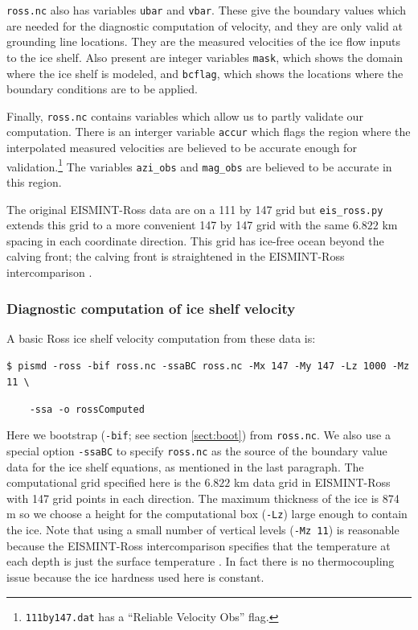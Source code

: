 \documentclass[11pt,final]{amsart}
\begin{document}
\verb|ross.nc| also has variables \verb|ubar| and \verb|vbar|.  These give the boundary values which are needed for the diagnostic computation of velocity, and they are only valid at grounding line locations.  They are the measured velocities of the ice flow inputs to the ice shelf.  Also present are integer variables \verb|mask|, which shows the domain where the ice shelf is modeled, and \verb|bcflag|, which shows the locations where the boundary conditions are to be applied.

Finally, \verb|ross.nc| contains variables which allow us to partly validate our computation.  There is an interger variable \verb|accur| which flags the region where the interpolated measured velocities are believed to be accurate enough for validation.\footnote{\texttt{111by147.dat} has a ``Reliable Velocity Obs'' flag.}  The variables \verb|azi_obs| and \verb|mag_obs| are believed to be accurate in this region.

The original EISMINT-Ross data are on a 111 by 147 grid but \verb|eis_ross.py| extends this grid to a more convenient 147 by 147 grid with the same $6.822$ km spacing in each coordinate direction.  This grid has ice-free ocean beyond the calving front; the calving front is straightened in the EISMINT-Ross intercomparison \cite{MacAyealetal}.

\subsubsection*{Diagnostic computation of ice shelf velocity}  A basic Ross ice shelf velocity computation from these data is:

\verb|$ pismd -ross -bif ross.nc -ssaBC ross.nc -Mx 147 -My 147 -Lz 1000 -Mz 11 \|

\verb|    -ssa -o rossComputed|

\noindent Here we bootstrap (\verb|-bif|; see section \ref{sect:boot}) from \verb|ross.nc|.  We also use a special option \verb|-ssaBC| to specify \verb|ross.nc| as the source of the boundary value data for the ice shelf equations, as mentioned in the last paragraph.  The computational grid specified here is the $6.822$ km data grid in EISMINT-Ross with 147 grid points in each direction.  The maximum thickness of the ice is 874 m so we choose a height for the computational box (\verb|-Lz|) large enough to contain the ice.  Note that using a small number of vertical levels (\verb|-Mz 11|) is reasonable because the EISMINT-Ross intercomparison specifies that the temperature at each depth is just the surface temperature \cite{MacAyealetal}.  In fact there is no thermocoupling issue because the ice hardness used here is constant.
\end{document}
